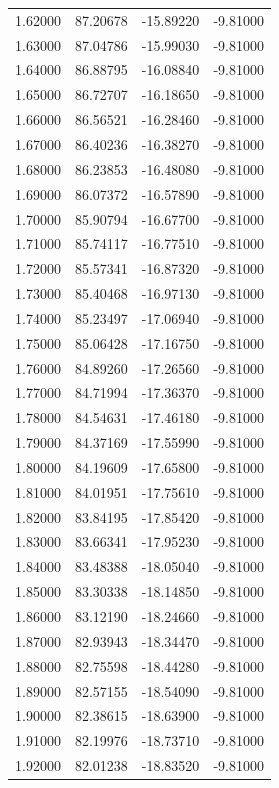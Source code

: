 \begin{table}
\begin{tabular}{llll}
1.62000 & 87.20678 & -15.89220 & -9.81000 \\
1.63000 & 87.04786 & -15.99030 & -9.81000 \\
1.64000 & 86.88795 & -16.08840 & -9.81000 \\
1.65000 & 86.72707 & -16.18650 & -9.81000 \\
1.66000 & 86.56521 & -16.28460 & -9.81000 \\
1.67000 & 86.40236 & -16.38270 & -9.81000 \\
1.68000 & 86.23853 & -16.48080 & -9.81000 \\
1.69000 & 86.07372 & -16.57890 & -9.81000 \\
1.70000 & 85.90794 & -16.67700 & -9.81000 \\
1.71000 & 85.74117 & -16.77510 & -9.81000 \\
1.72000 & 85.57341 & -16.87320 & -9.81000 \\
1.73000 & 85.40468 & -16.97130 & -9.81000 \\
1.74000 & 85.23497 & -17.06940 & -9.81000 \\
1.75000 & 85.06428 & -17.16750 & -9.81000 \\
1.76000 & 84.89260 & -17.26560 & -9.81000 \\
1.77000 & 84.71994 & -17.36370 & -9.81000 \\
1.78000 & 84.54631 & -17.46180 & -9.81000 \\
1.79000 & 84.37169 & -17.55990 & -9.81000 \\
1.80000 & 84.19609 & -17.65800 & -9.81000 \\
1.81000 & 84.01951 & -17.75610 & -9.81000 \\
1.82000 & 83.84195 & -17.85420 & -9.81000 \\
1.83000 & 83.66341 & -17.95230 & -9.81000 \\
1.84000 & 83.48388 & -18.05040 & -9.81000 \\
1.85000 & 83.30338 & -18.14850 & -9.81000 \\
1.86000 & 83.12190 & -18.24660 & -9.81000 \\
1.87000 & 82.93943 & -18.34470 & -9.81000 \\
1.88000 & 82.75598 & -18.44280 & -9.81000 \\
1.89000 & 82.57155 & -18.54090 & -9.81000 \\
1.90000 & 82.38615 & -18.63900 & -9.81000 \\
1.91000 & 82.19976 & -18.73710 & -9.81000 \\
1.92000 & 82.01238 & -18.83520 & -9.81000 \\

\end{tabular}
\end{table}
